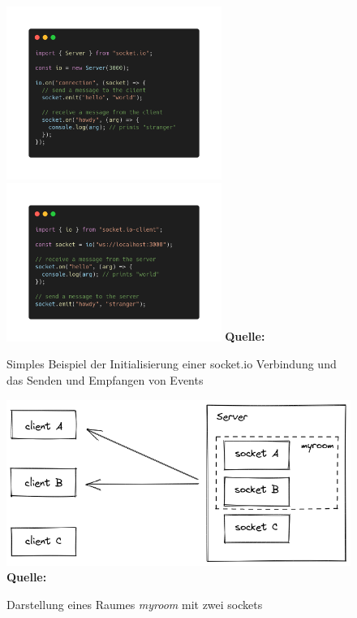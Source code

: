 \documentclass[a4paper,12pt]{report}
\begin{document}
  \begin{figure}[ht]
\raggedleft
  \includegraphics[width=70mm]{socket.io-server-beispiel.png}
  \includegraphics[width=70mm]{socket.io-client-beispiel.png}
    \footnotesize\sffamily\textbf{Quelle:} \cite{socketio}
  \caption{Simples Beispiel der Initialisierung einer socket.io Verbindung und das Senden und Empfangen von Events}
  \label{fig:socket.io-beispiel}
\end{figure}

  \begin{figure}[ht]
  \centering
  \includegraphics[width=160mm]{socket.io-rooms.png}
\raggedleft
    \footnotesize\sffamily\textbf{Quelle:} \cite{socket-rooms}
  \caption{Darstellung eines Raumes \textit{myroom} mit zwei sockets}
  \label{fig:socket.io-room}
\end{figure}
\end{document}
